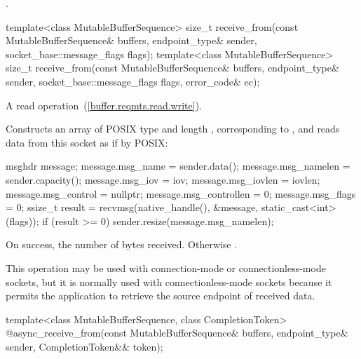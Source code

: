 \begin{itemdescr}
\pnum
\returns {}.
\end{itemdescr}

\begin{itemdecl}
template<class MutableBufferSequence>
  size_t receive_from(const MutableBufferSequence& buffers,
                      endpoint_type& sender,
                      socket_base::message_flags flags);
template<class MutableBufferSequence>
  size_t receive_from(const MutableBufferSequence& buffers,
                      endpoint_type& sender,
                      socket_base::message_flags flags,
                      error_code& ec);
\end{itemdecl}

\begin{itemdescr}
\pnum
A read operation~(\ref{buffer.reqmts.read.write}).

\pnum
\effects Constructs an array  of POSIX type  and length , corresponding to , and reads data from this socket as if by POSIX:
\begin{codeblock}
msghdr message;
message.msg_name = sender.data();
message.msg_namelen = sender.capacity();
message.msg_iov = iov;
message.msg_iovlen = iovlen;
message.msg_control = nullptr;
message.msg_controllen = 0;
message.msg_flags = 0;
ssize_t result = recvmsg(native_handle(), &message, static_cast<int>(flags));
if (result >= 0)
  sender.resize(message.msg_namelen);
\end{codeblock}


\pnum
\returns On success, the number of bytes received. Otherwise .

\pnum
 \begin{note} This operation may be used with connection-mode or connectionless-mode sockets, but it is normally used with connectionless-mode sockets because it permits the application to retrieve the source endpoint of received data. \end{note}
\end{itemdescr}

\begin{itemdecl}
template<class MutableBufferSequence, class CompletionToken>
  @\DEDUCED@ async_receive_from(const MutableBufferSequence& buffers,
                             endpoint_type& sender,
                             CompletionToken&& token);
\end{itemdecl}

